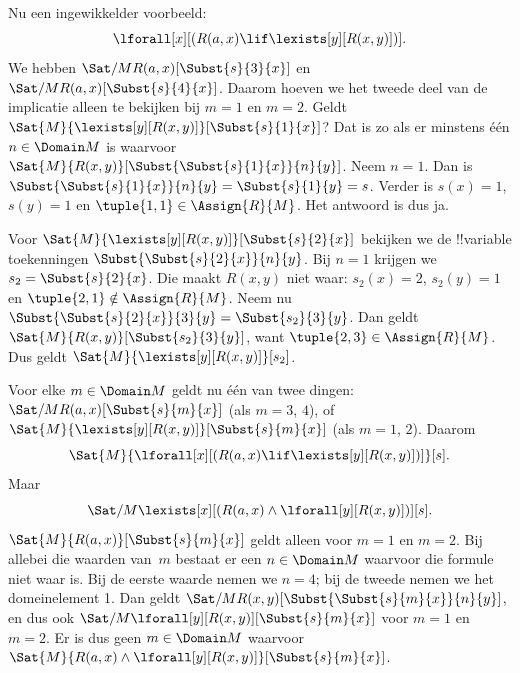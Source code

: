 \documentclass[../../../include/open-logic-section]{subfiles}
\begin{document}
\begin{ex}

Nu een ingewikkelder voorbeeld:
\[
\lforall[x][(R(a,x) \lif \lexists[y][R(x,y)])].
\]
We hebben $\Sat/{M}{R(a,x)}[\Subst{s}{3}{x}]$ en
$\Sat/{M}{R(a,x)}[\Subst{s}{4}{x}]$. Daarom hoeven we het tweede deel
van de implicatie alleen te bekijken bij $m = 1$ en $m = 2$. Geldt
$\Sat{M}{\lexists[y][R(x,y)]}[\Subst{s}{1}{x}]$? Dat is zo als er
minstens één $n \in \Domain M$ is waarvoor
$\Sat{M}{R(x,y)}[\Subst{\Subst{s}{1}{x}}{n}{y}]$. Neem $n = 1$.
Dan is $\Subst{\Subst{s}{1}{x}}{n}{y} = \Subst{s}{1}{y} = s$.
Verder is $s(x) = 1$, $s(y) = 1$ en $\tuple{1,1} \in \Assign{R}{M}$.
Het antwoord is dus ja.

Voor $\Sat{M}{\lexists[y][R(x,y)]}[\Subst{s}{2}{x}]$ bekijken we de
!!{variable} toekenningen $\Subst{\Subst{s}{2}{x}}{n}{y}$. Bij
$n = 1$ krijgen we~$s_2 = \Subst{s}{2}{x}$. Die maakt $R(x,y)$ niet
waar: $s_2(x) = 2$, $s_2(y) = 1$ en $\tuple{2,1}\notin \Assign{R}{M}$.
Neem nu $\Subst{\Subst{s}{2}{x}}{3}{y} = \Subst{s_2}{3}{y}$.
Dan geldt $\Sat{M}{R(x,y)}[\Subst{s_2}{3}{y}]$, want
$\tuple{2,3} \in \Assign{R}{M}$. Dus geldt
$\Sat{M}{\lexists[y][R(x,y)]}[s_2]$.

Voor elke $m \in \Domain M$ geldt nu één van twee dingen:
$\Sat/{M}{R(a,x)}[\Subst{s}{m}{x}]$ (als $m = 3$, $4$), of
$\Sat{M}{\lexists[y][R(x,y)]}[\Subst{s}{m}{x}]$ (als $m = 1$, $2$). Daarom
\[
\Sat{M}{\lforall[x][(R(a,x) \lif \lexists[y][R(x,y)])]}[s].
\]
Maar
\[
\Sat/{M}{\lexists[x][(R(a,x) \land \lforall[y][R(x,y)])]}[s].
\]
$\Sat{M}{R(a,x)}[\Subst{s}{m}{x}]$ geldt alleen voor $m = 1$ en $m =
2$. Bij allebei die waarden van~$m$ bestaat er een $n \in \Domain M$
waarvoor die formule niet waar is. Bij de eerste waarde nemen we $n = 4$;
bij de tweede nemen we het domeinelement 1. Dan geldt
$\Sat/{M}{R(x,y)}[\Subst{\Subst{s}{m}{x}}{n}{y}]$, en dus ook
$\Sat/{M}{\lforall[y][R(x,y)]}[\Subst{s}{m}{x}]$ voor $m = 1$ en $m =
2$. Er is dus geen $m \in \Domain M$ waarvoor
$\Sat{M}{R(a,x) \land \lforall[y][R(x,y)]}[\Subst{s}{m}{x}]$.
\end{ex}
\end{document}
